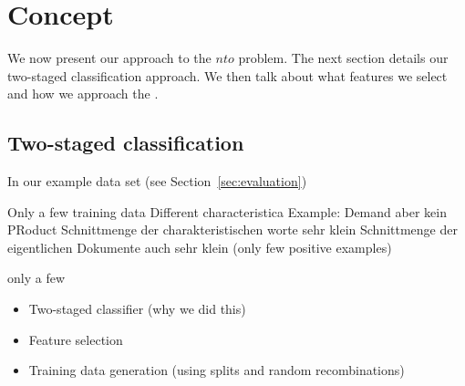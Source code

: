 \section{Concept}
\label{sec:concept}

We now present our approach to the $nto$ problem.
The next section details our two-staged classification approach.
We then talk about what features we select and how we approach the \emph{\documentmismatch}.

\subsection{Two-staged classification}

In our example data set (see Section~\ref{sec:evaluation})

Only a few training data
Different characteristica
Example: Demand aber kein PRoduct
Schnittmenge der charakteristischen worte sehr klein
Schnittmenge der eigentlichen Dokumente auch sehr klein (only few positive examples)

only a few 

\begin{itemize}
	\item Two-staged classifier (why we did this)
	\item Feature selection
	\item Training data generation (using splits and random recombinations)
\end{itemize}


